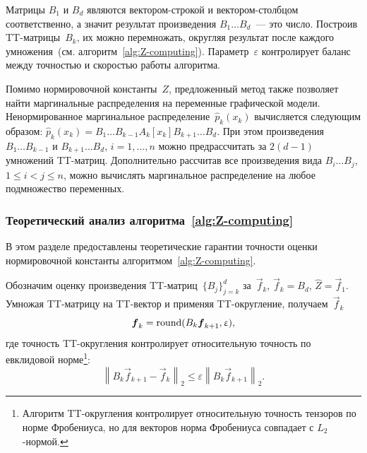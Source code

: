 Матрицы $B_1$ и $B_d$ являются вектором-строкой и вектором-столбцом соответственно, а значит результат произведения $B_1 \ldots B_d$~--- это число.
Построив TT\hyp{}матрицы~$B_k$, их можно перемножать, округляя результат после каждого умножения~(см. алгоритм~\ref{alg:Z-computing}). Параметр~$\varepsilon$ контролирует баланс между точностью и скоростью работы алгоритма.

Помимо нормировочной константы~$Z$, предложенный метод также позволяет найти маргинальные распределения на переменные графической модели. Ненормированное маргинальное распределение~$\hat{p}_k(x_k)$ вычисляется следующим образом:
$
\hat{p}_k(x_k) = B_1\ldots B_{k-1} A_k[x_k] B_{k+1}\ldots B_{d}.
$
При этом произведения~$B_1\ldots B_{k-1}$ и $B_{k+1}\ldots B_{d}$, $i=1,\ldots,n$ можно предрассчитать за $2 (d - 1)$ умножений TT\hyp{}матриц. Дополнительно рассчитав все произведения вида $B_i\ldots B_j$, $1 \leq i < j \leq n$, можно вычислять маргинальное распределение на любое подмножество переменных.

\subsubsection{Теоретический анализ алгоритма~\ref{alg:Z-computing}}
В этом разделе предоставлены теоретические гарантии точности оценки нормировочной константы алгоритмом~\ref{alg:Z-computing}.

Обозначим оценку произведения TT\hyp{}матриц~$\{B_j\}_{j = k}^d$ за~$\vec{f}_k$, $\vec{f}_k = B_d$, $\widehat{Z} = \vec{f}_1$. Умножая TT\hyp{}матрицу на TT\hyp{}вектор и применяя TT\hyp{}округление, получаем~$\vec{f}_k$
$$
\boldsymbol{f}_k = \operatorname{round}(B_k \boldsymbol{f}_{k + 1}, \upvarepsilon),
$$
где точность TT\hyp{}округления контролирует относительную точность по евклидовой норме\footnote{Алгоритм TT\hyp{}округления контролирует относительную точность тензоров по норме Фробениуса, но для векторов норма Фробениуса совпадает с $L_2$-нормой.}:
\begin{equation}
\label{main-algorithm-rounding-inequality}
\left \| B_k \vec{f}_{k + 1} - \vec{f}_k \right \|_2 \leq \varepsilon \left \| B_k \vec{f}_{k + 1} \right \|_2.
\end{equation}

